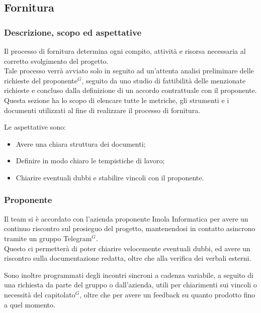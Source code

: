 \subsection{Fornitura}

\subsubsection{Descrizione, scopo ed aspettative}

Il processo di fornitura determina ogni compito, attività e risorsa necessaria al corretto svolgimento del progetto. \\
Tale processo verrà avviato solo in seguito ad un’attenta analisi preliminare delle richieste del proponente$^{G}$, seguito da uno studio di fattibilità delle menzionate
richieste e concluso dalla definizione di un accordo contrattuale con il proponente. \\

Questa sezione ha lo scopo di elencare tutte le metriche, gli strumenti e i documenti utilizzati al fine di realizzare il processo di fornitura.

Le aspettative sono:
\begin{itemize}
    \item Avere una chiara struttura dei documenti;
    \item Definire in modo chiaro le tempistiche di lavoro;
    \item Chiarire eventuali dubbi e stabilire vincoli con il proponente.
\end{itemize}
\subsubsection{Proponente}

Il team si è accordato con l'azienda proponente Imola Informatica per avere un continuo riscontro sul prosieguo del progetto, mantenendosi in contatto asincrono tramite un gruppo Telegram$^{G}$. \\
Questo ci permetterà di poter chiarire velocemente eventuali dubbi, ed avere un riscontro sulla documentazione redatta, oltre che alla verifica dei verbali esterni.

Sono inoltre programmati degli incontri sincroni a cadenza variabile, a seguito di una richiesta da parte del gruppo o dall'azienda, utili per chiarimenti sui vincoli o necessità del capitolato$^{G}$, oltre che per avere un feedback su quanto prodotto fino a quel momento.





